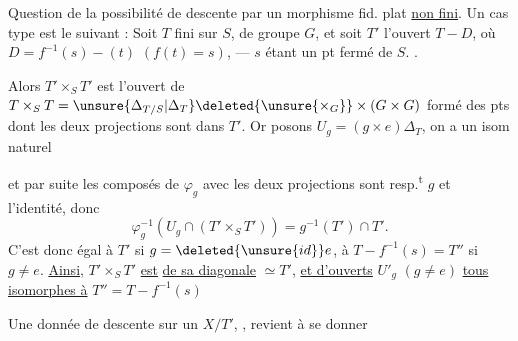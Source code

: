 Question de la possibilité de descente par un morphisme fid. plat \uline{non fini}. Un cas type est le suivant : Soit $T$   fini sur $S$, de groupe $G$, et  soit $T'$ l'ouvert  $T-D$, où $D=f^{-1}(s)-(t)$ $(f(t)=s)$, --- $s$ étant un pt fermé de $S$. .


Alors $T'\times_S T'$ est l'ouvert de $T\times_S T=\unsure{\Delta_{T/S}|\Delta_T}\deleted{\unsure{\times_G}}\times(G\times G)$ formé des pts dont les deux projections sont dans $T'$. Or posons $U_g=(g\times e)\Delta_T$,  on a un isom naturel
 

et par suite les composés de $\varphi_g$ avec les deux projections sont resp.\textsuperscript{t} $g$ et l'identité, donc
\[
\varphi_g^{-1}(U_g\cap(T'\times_S T'))=g^{-1}(T')\cap T'.
\]
C'est donc égal à $T'$ si $g=\deleted{\unsure{id}}e$, à $T-f^{-1}(s)=T''$ si $g\ne e$. \uline{Ainsi}, $T'\times_S T'$ \uline{est}    \uline{de sa diagonale} $\simeq T'$, \uline{et d'ouverts} $U'_g$ $(g\ne e)$ \uline{tous isomorphes à} $T''=T-f^{-1}(s)$

Une donnée de descente sur un $X/T'$, , revient  à se donner
 
